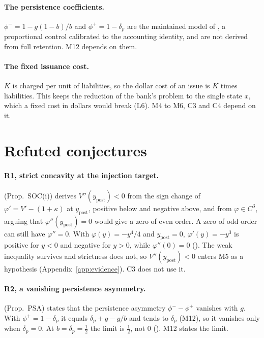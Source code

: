 \paragraph{The persistence coefficients.} $\phi^-=1-g(1-b)/b$ and
$\phi^+=1-\delta_p$ are the maintained model of , a
proportional control calibrated to the accounting identity, and are not
derived from full retention. M12 depends on them.

\paragraph{The fixed issuance cost.} $K$ is charged per unit of
liabilities, so the dollar cost of an issue is $K$ times liabilities. This
keeps the reduction of the bank's problem to the single state $x$, which a
fixed cost in dollars would break (L6). M4 to M6, C3 and C4 depend on it.

\section{Refuted conjectures}
\label{app:refuted}

\paragraph{R1, strict concavity at the injection target.}
 (Prop.~SOC(i)) derives $V''(y_{\text{post}})<0$ from the
sign change of $\varphi'=V'-(1+\kappa)$ at $y_{\text{post}}$, positive below and
negative above, and from $\varphi\in C^3$, arguing that $\varphi''(y_{\text{post}})=0$
would give a zero of even order. A zero of odd order can still have
$\varphi''=0$. With $\varphi(y)=-y^4/4$ and $y_{\text{post}}=0$,
$\varphi'(y)=-y^3$ is positive for $y<0$ and negative for $y>0$, while
$\varphi''(0)=0$ (). The weak
inequality survives and strictness does not, so $V''(y_{\text{post}})<0$ enters
M5 as a hypothesis (Appendix~\ref{app:evidence}). C3 does not use it.

\paragraph{R2, a vanishing persistence asymmetry.} 
(Prop.~PSA) states that the persistence asymmetry $\phi^--\phi^+$ vanishes
with $g$. With $\phi^+=1-\delta_p$ it equals $\delta_p+g-g/b$ and tends to
$\delta_p$ (M12), so it vanishes only when $\delta_p=0$. At
$b=\delta_p=\tfrac12$ the limit is $\tfrac12$, not $0$
(). M12 states the limit.


